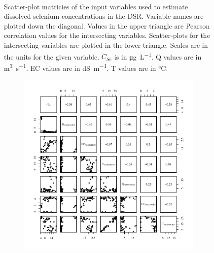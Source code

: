 \begin{linenumbers}
\begin{landscape}
\begin{figure}
\begin{subfigure}{0.7\textwidth}
		\end{subfigure}\\
		\caption[Scatter-plot matricies of the input variables used to estimate dissolved selenium concentrations in the DSR.]{Scatter-plot matricies of the input variables used to estimate dissolved selenium concentrations in the DSR.  Variable names are plotted down the diagonal.  Values in the upper triangle are Pearson correlation values for the intersecting variables.  Scatter-plots for the intersecting variables are plotted in the lower triangle.  Scales are in the units for the given variable.  $C_{Se}$ is in \si{\micro\gram\per\liter}.  Q values are in \si{\cubic\meter\per\second}.  EC values are in \si{\deci\siemens\per\meter}.  T values are in \si{\degreeCelsius}.}
		\label{fig:concFullPairs_DS}
	\end{figure}
\end{landscape}
\subfiguremid
\begin{landscape}
	\begin{figure}
		\begin{subfigure}{0.7\textwidth}
			\centering
			\includegraphics[width=\tableCustomSize]{"Figures/Results_DSR/Stochastic/Conc Model Full PairsD101C"}
		\end{subfigure}%
		\begin{subfigure}{0.7\textwidth}

\end{subfigure}
\end{figure}
\end{landscape}
\end{linenumbers}
